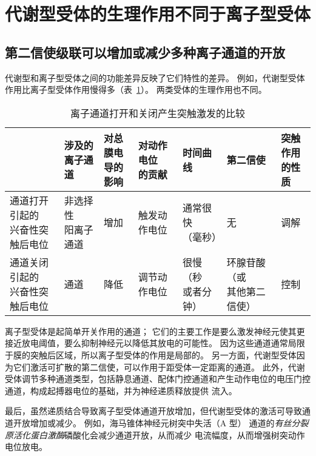 \section{代谢型受体的生理作用不同于离子型受体}

\subsection{第二信使级联可以增加或减少多种离子通道的开放}

代谢型和离子型受体之间的功能差异反映了它们特性的差异。
例如，代谢型受体作用比离子型受体作用慢得多（表~\ref{tab:14_1}）。
两类受体的生理作用也不同。


\begin{table}[htbp]
	\caption{离子通道打开和关闭产生突触激发的比较} \label{tab:14_1} \centering
	\begin{tabular}{lllllll}
		\toprule
		 & \makecell[l]{涉及的\\离子通道} & \makecell[l]{对总膜电\\导的影响} & \makecell[l]{对动作电位\\的贡献} & 时间曲线 & 第二信使 & \makecell[l]{突触作用\\的性质} \\
		\midrule
		\makecell[l]{通道打开引起的\\兴奋性突触后电位} & \makecell[l]{非选择性\\阳离子通道} & 增加 & 触发动作电位 & \makecell[l]{通常很快\\（毫秒）} & 无 & 调解\\
		\midrule
		\makecell[l]{通道关闭引起的\\兴奋性突触后电位} & \ce{K+} 通道 & 降低 & 调节动作电位 & \makecell[l]{很慢（秒\\或者分钟）} & \makecell[l]{环腺苷酸（或\\其他第二信使）} & 控制 \\
		\bottomrule
	\end{tabular}
\end{table}


离子型受体是起简单开关作用的通道；
它们的主要工作是要么激发神经元使其更接近放电阈值，要么抑制神经元以降低其放电的可能性。
因为这些通道通常局限于膜的突触后区域，所以离子型受体的作用是局部的。
另一方面，代谢型受体因为它们激活可扩散的第二信使，可以作用于距受体一定距离的通道。
此外，代谢受体调节多种通道类型，包括静息通道、配体门控通道和产生动作电位的电压门控通道，构成起搏器电位的基础，并为神经递质释放提供  流入。


最后，虽然递质结合导致离子型受体通道开放增加，但代谢型受体的激活可导致通道开放增加或减少。
例如，海马锥体神经元树突中失活（A 型） 通道的\textit{有丝分裂原活化蛋白激酶}磷酸化会减少通道开放，从而减少  电流幅度，从而增强树突动作电位放电。


